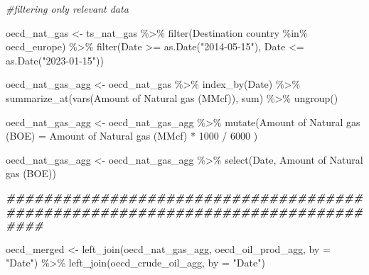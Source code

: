 \documentclass[
]{article}
\newenvironment{Shaded}{\begin{snugshade}}{\end{snugshade}}
\newcommand{\AttributeTok}[1]{\textcolor[rgb]{0.77,0.63,0.00}{#1}}
\newcommand{\CommentTok}[1]{\textcolor[rgb]{0.56,0.35,0.01}{\textit{#1}}}
\newcommand{\DecValTok}[1]{\textcolor[rgb]{0.00,0.00,0.81}{#1}}
\newcommand{\DocumentationTok}[1]{\textcolor[rgb]{0.56,0.35,0.01}{\textbf{\textit{#1}}}}
\newcommand{\FunctionTok}[1]{\textcolor[rgb]{0.00,0.00,0.00}{#1}}
\newcommand{\NormalTok}[1]{#1}
\newcommand{\OtherTok}[1]{\textcolor[rgb]{0.56,0.35,0.01}{#1}}
\newcommand{\SpecialCharTok}[1]{\textcolor[rgb]{0.00,0.00,0.00}{#1}}
\newcommand{\StringTok}[1]{\textcolor[rgb]{0.31,0.60,0.02}{#1}}
\begin{document}
\begin{Shaded}
\begin{Highlighting}[]
\CommentTok{\#filtering only relevant data}

\NormalTok{oecd\_nat\_gas }\OtherTok{\textless{}{-}}\NormalTok{ ts\_nat\_gas }\SpecialCharTok{\%\textgreater{}\%}
  \FunctionTok{filter}\NormalTok{(}\StringTok{\textasciigrave{}}\AttributeTok{Destination country}\StringTok{\textasciigrave{}} \SpecialCharTok{\%in\%}\NormalTok{ oecd\_europe) }\SpecialCharTok{\%\textgreater{}\%} 
  \FunctionTok{filter}\NormalTok{(Date }\SpecialCharTok{\textgreater{}=} \FunctionTok{as.Date}\NormalTok{(}\StringTok{"2014{-}05{-}15"}\NormalTok{), Date }\SpecialCharTok{\textless{}=} \FunctionTok{as.Date}\NormalTok{(}\StringTok{"2023{-}01{-}15"}\NormalTok{))}

\NormalTok{oecd\_nat\_gas\_agg }\OtherTok{\textless{}{-}}\NormalTok{ oecd\_nat\_gas }\SpecialCharTok{\%\textgreater{}\%}
  \FunctionTok{index\_by}\NormalTok{(Date) }\SpecialCharTok{\%\textgreater{}\%}
  \FunctionTok{summarize\_at}\NormalTok{(}\FunctionTok{vars}\NormalTok{(}\StringTok{\textasciigrave{}}\AttributeTok{Amount of Natural gas (MMcf)}\StringTok{\textasciigrave{}}\NormalTok{), sum) }\SpecialCharTok{\%\textgreater{}\%}
  \FunctionTok{ungroup}\NormalTok{()}

\NormalTok{oecd\_nat\_gas\_agg }\OtherTok{\textless{}{-}}\NormalTok{ oecd\_nat\_gas\_agg }\SpecialCharTok{\%\textgreater{}\%} 
  \FunctionTok{mutate}\NormalTok{(}\StringTok{\textasciigrave{}}\AttributeTok{Amount of Natural gas (BOE)}\StringTok{\textasciigrave{}} \OtherTok{=} \StringTok{\textasciigrave{}}\AttributeTok{Amount of Natural gas (MMcf)}\StringTok{\textasciigrave{}} \SpecialCharTok{*} \DecValTok{1000} \SpecialCharTok{/} \DecValTok{6000}\NormalTok{ )}

\NormalTok{oecd\_nat\_gas\_agg }\OtherTok{\textless{}{-}}\NormalTok{ oecd\_nat\_gas\_agg }\SpecialCharTok{\%\textgreater{}\%} 
  \FunctionTok{select}\NormalTok{(Date, }\StringTok{\textasciigrave{}}\AttributeTok{Amount of Natural gas (BOE)}\StringTok{\textasciigrave{}}\NormalTok{)}

\DocumentationTok{\#\#\#\#\#\#\#\#\#\#\#\#\#\#\#\#\#\#\#\#\#\#\#\#\#\#\#\#\#\#\#\#\#\#\#\#\#\#\#\#\#\#\#\#\#\#\#\#\#\#\#\#\#\#\#\#\#\#\#\#\#\#\#\#\#\#\#\#\#\#\#\#\#\#\#\#\#\#\#\#}

\NormalTok{oecd\_merged }\OtherTok{\textless{}{-}} \FunctionTok{left\_join}\NormalTok{(oecd\_nat\_gas\_agg, oecd\_oil\_prod\_agg, }\AttributeTok{by =} \StringTok{"Date"}\NormalTok{) }\SpecialCharTok{\%\textgreater{}\%}
  \FunctionTok{left\_join}\NormalTok{(oecd\_crude\_oil\_agg, }\AttributeTok{by =} \StringTok{"Date"}\NormalTok{)}


\end{Highlighting}
\end{Shaded}
\end{document}

